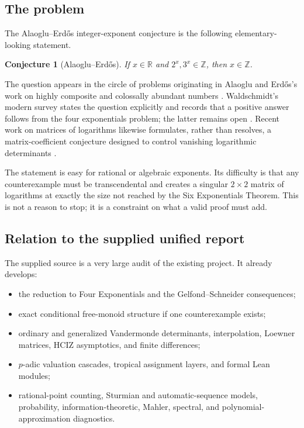 \documentclass[11pt,oneside]{article}
\newtheorem{conjecture}[theorem]{Conjecture}
\theoremstyle{definition}
\theoremstyle{remark}
\newcommand{\Z}{\mathbb Z}
\newcommand{\R}{\mathbb R}
\newcommand{\AEname}{Alaoglu--Erd\H{o}s}
\begin{document}
\subsection{The problem}

The \AEname{} integer-exponent conjecture is the following elementary-looking statement.

\begin{conjecture}[\AEname{}]
If $x\in\R$ and $2^x,3^x\in\Z$, then $x\in\Z$.
\end{conjecture}

The question appears in the circle of problems originating in Alaoglu and Erd\H{o}s's work on
highly composite and colossally abundant numbers \cite{AlaogluErdos1944}.  Waldschmidt's
modern survey states the question explicitly and records that a positive answer follows from
the four exponentials problem; the latter remains open \cite{Waldschmidt2023}.  Recent work on
matrices of logarithms likewise formulates, rather than resolves, a matrix-coefficient
conjecture designed to control vanishing logarithmic determinants \cite{DasguptaKakde2024}.

The statement is easy for rational or algebraic exponents.  Its difficulty is that any
counterexample must be transcendental and creates a singular $2\times2$ matrix of logarithms
at exactly the size not reached by the Six Exponentials Theorem.  This is not a reason to stop;
it is a constraint on what a valid proof must add.

\subsection{Relation to the supplied unified report}

The supplied source
is a very large audit of the existing project.  It already develops:

\begin{itemize}
\item the reduction to Four Exponentials and the Gelfond--Schneider consequences;
\item exact conditional free-monoid structure if one counterexample exists;
\item ordinary and generalized Vandermonde determinants, interpolation, Loewner matrices,
      HCIZ asymptotics, and finite differences;
\item $p$-adic valuation cascades, tropical assignment layers, and formal Lean modules;
\item rational-point counting, Sturmian and automatic-sequence models, probability,
      information-theoretic, Mahler, spectral, and polynomial-approximation diagnostics.
\end{itemize}
\end{document}

